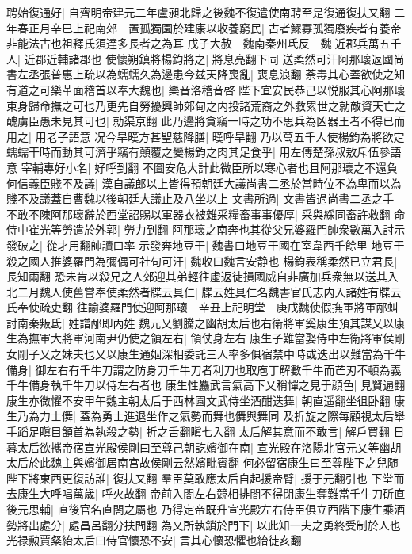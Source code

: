聘始復通好|{
	自齊明帝建元二年盧昶北歸之後魏不復遣使南聘至是復通復扶又翻}
二年春正月辛巳上祀南郊　置孤獨園於建康以收養窮民|{
	古者鰥寡孤獨廢疾者有養帝非能法古也祖釋氏須達多長者之為耳}
戊子大赦　魏南秦州氐反　魏近郡兵萬五千人|{
	近郡近輔諸郡也}
使懷朔鎮將楊鈞將之|{
	將息亮翻下同}
送柔然可汗阿那瓌返國尚書左丞張普惠上疏以為蠕蠕久為邊患今兹天降喪亂|{
	喪息浪翻}
荼毒其心蓋欲使之知有道之可樂革面稽首以奉大魏也|{
	樂音洛稽音啓}
陛下宜安民恭己以悦服其心阿那瓌束身歸命撫之可也乃更先自勞擾興師郊甸之内投諸荒裔之外救累世之勍敵資天亡之醜虜臣愚未見其可也|{
	勍渠京翻}
此乃邊將貪竊一時之功不思兵為凶器王者不得已而用之|{
	用老子語意}
况今旱暵方甚聖慈降膳|{
	暵呼旱翻}
乃以萬五千人使楊鈞為將欲定蠕蠕干時而動其可濟乎竊有顛覆之變楊鈞之肉其足食乎|{
	用左傳楚孫叔敖斥伍參語意}
宰輔專好小名|{
	好呼到翻}
不圖安危大計此微臣所以寒心者也且阿那瓌之不還負何信義臣賤不及議|{
	漢自議郎以上皆得預朝廷大議尚書二丞於當時位不為卑而以為賤不及議蓋自曹魏以後朝廷大議止及八坐以上}
文書所過|{
	文書皆過尚書二丞之手}
不敢不陳阿那瓌辭於西堂詔賜以軍器衣被雜采糧畜事事優厚|{
	采與綵同畜許救翻}
命侍中崔光等勞遣於外郭|{
	勞力到翻}
阿那瓌之南奔也其從父兄婆羅門帥衆數萬入討示發破之|{
	從才用翻帥讀曰率}
示發奔地豆干|{
	魏書曰地豆干國在室韋西千餘里}
地豆干殺之國人推婆羅門為彌偶可社句可汗|{
	魏收曰魏言安静也}
楊鈞表稱柔然已立君長|{
	長知兩翻}
恐未肯以殺兄之人郊迎其弟輕往虛返徒損國威自非廣加兵衆無以送其入北二月魏人使舊嘗奉使柔然者牒云具仁|{
	牒云姓具仁名魏書官氏志内入諸姓有牒云氏奉使疏吏翻}
往諭婆羅門使迎阿那瓌　辛丑上祀明堂　庚戌魏使假撫軍將軍邴虯討南秦叛氐|{
	姓譜邴即丙姓}
魏元乂劉騰之幽胡太后也右衛將軍奚康生預其謀乂以康生為撫軍大將軍河南尹仍使之領左右|{
	領仗身左右}
康生子難當娶侍中左衛將軍侯剛女剛子乂之妹夫也乂以康生通姻深相委託三人率多俱宿禁中時或迭出以難當為千牛備身|{
	御左右有千牛刀謂之防身刀千牛刀者利刀也取庖丁解數千牛而芒刃不頓為義千牛備身執千牛刀以侍左右者也}
康生性麤武言氣高下乂稍憚之見于顔色|{
	見賢遍翻}
康生亦微懼不安甲午魏主朝太后于西林園文武侍坐酒酣迭舞|{
	朝直遥翻坐徂卧翻}
康生乃為力士儛|{
	蓋為勇士進退坐作之氣勢而舞也儛與舞同}
及折旋之際每顧視太后舉手蹈足瞋目頷首為執殺之勢|{
	折之舌翻瞋七入翻}
太后解其意而不敢言|{
	解戶買翻}
日暮太后欲攜帝宿宣光殿侯剛曰至尊己朝訖嬪御在南|{
	宣光殿在洛陽北官元乂等幽胡太后於此魏主與嬪御居南宫故侯剛云然嬪毗賓翻}
何必留宿康生曰至尊陛下之兒随陛下將東西更復訪誰|{
	復扶又翻}
羣臣莫敢應太后自起援帝臂|{
	援于元翻引也}
下堂而去康生大呼唱萬歲|{
	呼火故翻}
帝前入閤左右競相排閤不得閉康生奪難當千牛刀斫直後元思輔|{
	直後官名直閤之屬也}
乃得定帝既升宣光殿左右侍臣俱立西階下康生乘酒勢將出處分|{
	處昌呂翻分扶問翻}
為乂所執鎖於門下|{
	以此知一夫之勇終受制於人也}
光禄勲賈粲紿太后曰侍官懷恐不安|{
	言其心懷恐懼也紿徒亥翻}
